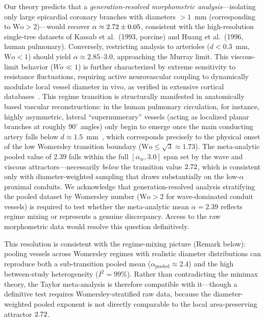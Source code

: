 Our theory predicts that a \emph{generation-resolved morphometric
analysis}---isolating only large epicardial coronary branches with diameters $>
1$~mm (corresponding to $\mathrm{Wo} > 2$)---would recover $\alpha \approx
2.72 \pm 0.05$, consistent with the high-resolution single-tree
datasets of Kassab et al.~(1993, porcine) and Huang et al.~(1996, human
pulmonary). Conversely, restricting analysis to arterioles ($d < 0.3$~mm,
$\mathrm{Wo} < 1$) should yield $\alpha \approx 2.85$--$3.0$, approaching the
Murray limit. This viscous-limit behavior ($Wo \ll 1$) is further characterized
by extreme sensitivity to resistance fluctuations, requiring active
neurovascular coupling to dynamically modulate local vessel diameter in vivo, as
verified in extensive cortical databases~\cite{uhlirova2017}. This regime
transition is structurally manifested in anatomically based vascular
reconstructions: in the human pulmonary circulation, for instance, highly
asymmetric, lateral ``supernumerary'' vessels (acting as localized planar
branches at roughly $90^\circ$ angles) only begin to emerge once the main
conducting artery falls below $d \approx 1.5$~mm~\cite{burrowes2005}, which
corresponds precisely to the physical onset of the low Womersley transition
boundary ($\mathrm{Wo} \le \sqrt{3} \approx 1.73$). The meta-analytic
pooled value of $2.39$ falls within the full $[\alpha_w, 3.0]$ span set by the
wave and viscous attractors---necessarily \emph{below} the transition value
$2.72$, which is consistent only with diameter-weighted sampling that
draws substantially on the low-$\alpha$ proximal conduits. We acknowledge that
generation-resolved analysis stratifying the pooled dataset by Womersley number
($\mathrm{Wo} > 2$ for wave-dominated conduit vessels) is required to test
whether the meta-analytic mean $\alpha = 2.39$ reflects regime mixing or
represents a genuine discrepancy. Access to the raw morphometric data would
resolve this question definitively.

This resolution is consistent with the regime-mixing picture (Remark
below): pooling vessels across Womersley regimes with realistic diameter
distributions can reproduce both a sub-transition pooled mean
($\alpha_{\mathrm{pooled}} \approx 2.4$) and the high between-study
heterogeneity ($I^2 = 99\%$). Rather than contradicting the minimax theory, the
Taylor meta-analysis is therefore compatible with it---though a definitive test
requires Womersley-stratified raw data, because the diameter-weighted pooled
exponent is not directly comparable to the local area-preserving attractor
$2.72$.

